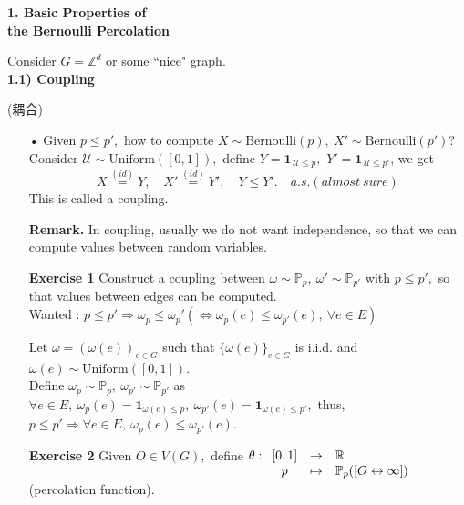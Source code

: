 \documentclass[12pt,a4paper]{article}
\newcommand{\SOL}{\fbox{ \tt s\parbox[b][2pt][c]{6pt}{o}\hspace*{-7pt} L:}}
\begin{document}
\newpage
\begin{flushleft}
\vspace*{5cm}
\Huge \textbf{1. Basic Properties of \\ \quad the Bernoulli Percolation}
\vspace*{3cm}
\end{flushleft}
\begin{flushleft}
	Consider $G=\mathbb{Z}^d$ or some ``nice" graph.\\[1cm]
	\Large \textbf{1.1) Coupling} \begin{CJK}{UTF8}{bkai}(耦合)\end{CJK}
\end{flushleft}
\begin{enumerate}
	\item[•] Given $p\leq p',$ how to compute $X\sim \mathrm{Bernoulli}(p),\ X'\sim\mathrm{Bernoulli}(p')$?\\
	Consider $\mathcal{U}\sim\mathrm{Uniform}([0,1]),$ define $Y=\mathbf{1}_{\, \mathcal{U}\leq p},$ $Y'=\mathbf{1}_{\, \mathcal{U}\leq p'}$, we get 
	\[
	X\overset{(id)}{=}Y,\quad X'\overset{(id)}{=}Y',\quad Y\leq Y'.\quad a.s. (almost\ sure)
	\]
	This is called a coupling.
	\item[\textbf{Remark.}] In coupling, usually we do not want independence, so that we can compute values between random variables.
	\item[\textbf{Exercise 1}] Construct a coupling between $\omega\sim\mathbb{P}_p,\ \omega'\sim\mathbb{P}_{p'}$ with $p\leq p',$ so that values between edges can be computed.\\
	Wanted : $p\leq p'\Rightarrow \omega_p\leq \omega_p'(\Leftrightarrow \omega_p(e)\leq \omega_{p'}(e),\ \forall e\in E)$
	\item[\SOL] Let $\omega=(\omega(e))_{e\in G}$ such that $\{\omega(e)\}_{e\in G}$ is i.i.d. and $\omega(e)\sim \mathrm{Uniform}([0,1]).$ \\
	Define $\omega_p\sim\mathbb{P}_p,\ \omega_{p'}\sim\mathbb{P}_{p'}$ as $\forall e\in E,\ \omega_p(e)=\mathbf{1}_{\omega(e)\leq p},\ \omega_{p'}(e)=\mathbf{1}_{\omega(e)\leq p'},$ thus, $p\leq p'\Rightarrow \forall e\in E,\ \omega_p(e)\leq \omega_{p'}(e).$
	\item[\textbf{Exercise 2}] Given $O\in V(G),$ define $\theta:\begin{array}[t]{ccl}
	[0,1]&\to&\mathbb{R}\\
	p&\mapsto&\mathbb{P}_p([O\leftrightarrow\infty])
	\end{array}	 $ (percolation function).\\

\end{enumerate}
\end{document}
